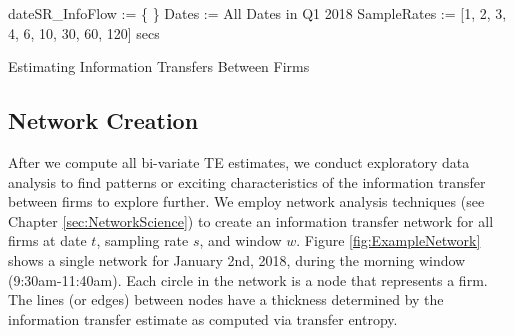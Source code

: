 \begin{algorithm}[H]

\SetAlgoLined

dateSR\_InfoFlow := \{ \} \;
Dates := All Dates in Q1 2018 \;
SampleRates := [1, 2, 3, 4,  6, 10, 30, 60, 120] secs \;


\caption{Estimating Information Transfers Between Firms}
\label{alg:EstIF}
\end{algorithm}


\subsection{Network Creation}
After we compute all bi-variate TE estimates, we conduct exploratory data analysis to find patterns or exciting characteristics of the information transfer between firms to explore further.   We employ network analysis techniques (see Chapter \ref{sec:NetworkScience}) to create an information transfer network for all firms at date $t$, sampling rate $s$, and window $w$.  Figure \ref{fig:ExampleNetwork} shows a single network for January 2nd,  2018, during the morning window (9:30am-11:40am).  Each circle in the network is a node that represents a firm. The lines (or edges) between nodes have a thickness determined by the information transfer estimate as computed via transfer entropy. 

